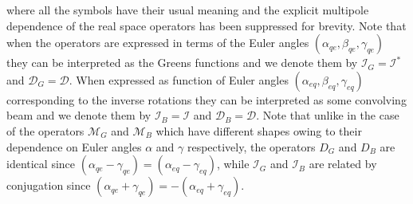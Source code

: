 \documentclass[a4paper,11pt]{article}
\newcommand{\mm}{\mathcal{M}}
\begin{document}
%
where all the symbols have their usual meaning and the explicit multipole dependence of the real space operators has been suppressed for brevity. Note that when the operators are expressed in terms of the Euler angles $(\alpha_{qe},\beta_{qe},\gamma_{qe})$ they can be interpreted as the Greens functions and  we denote them by $\mathcal{I}_G=\mathcal{I}^*$ and $\mathcal{D}_G=\mathcal{D}$. When expressed as function of Euler angles $(\alpha_{eq},\beta_{eq},\gamma_{eq})$ corresponding to the inverse rotations they can be interpreted as some convolving beam and we denote them by $\mathcal{I}_B=\mathcal{I}$ and $\mathcal{D}_B=\mathcal{D}$. Note that unlike in the case of the operators $\mm_G$ and $\mm_B$ which have different shapes owing to their dependence on Euler angles $\alpha$ and $\gamma$ respectively, the operators $D_G$ and $D_B$ are identical since $(\alpha_{qe}-\gamma_{qe}) = (\alpha_{eq}-\gamma_{eq})$, while $\mathcal{I}_{G}$ and $\mathcal{I}_B$ are related by conjugation since  $(\alpha_{qe}+\gamma_{qe}) = -(\alpha_{eq}+\gamma_{eq})$.
\end{document}
